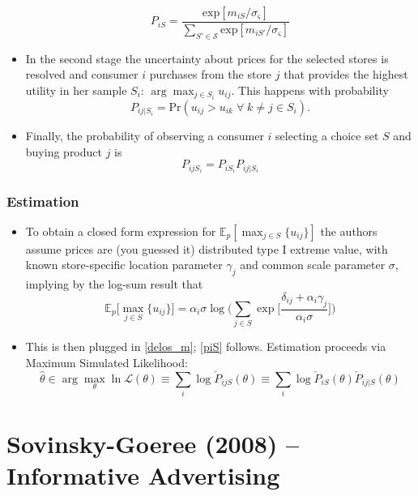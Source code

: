\documentclass[11pt]{article}
\numberwithin{equation}{section}
\begin{document}
\begin{itemize}
		\begin{equation}
    \label{piS}
		P_{iS} = \frac{\text{exp}[m_{iS}/\sigma_{\varsigma}]}{\sum_{S'\in \mathscr{S}}\text{exp}[m_{iS'}/\sigma_{\varsigma}]}
		\end{equation}
		\item In the second stage the uncertainty about prices for the selected stores is resolved and consumer $i$ purchases from the store $j$ that provides the highest utility in her sample $S_i$: $\arg\max_{j\in S_i}u_{ij}$. This happens with probability
		\begin{equation}
		P_{ij|S_i}=\text{Pr}(u_{ij}>u_{ik}\;\forall\;k\neq j\in S_i).
		\end{equation}
		\item Finally, the probability of observing a consumer $i$ selecting a choice set $S$ and buying product $j$ is
		\begin{equation}
		P_{ijS_i} = P_{iS_i}P_{ij|S_i}
		\end{equation}
		\end{itemize}
	\subsubsection*{Estimation}
	 \begin{itemize}
		\item To obtain a closed form expression for $\mathbb{E}_p[\max_{j\in S}\{u_{ij}\}]$ the authors assume prices are (you guessed it) distributed type I extreme value, with known store-specific location parameter $\gamma_j$ and common scale parameter $\sigma$, implying by the log-sum result that
		\begin{equation}
		\mathbb{E}_p\bigg[\max_{j\in S}\{u_{ij}\}\bigg]=\alpha_i\sigma\log\bigg(\sum_{j\in S}\exp\bigg[\frac{\delta_{ij}+\alpha_i\gamma_j}{\alpha_i\sigma}\bigg]\bigg)
		\end{equation}
		\item This is then plugged in \eqref{delos_m}; \eqref{piS} follows. Estimation proceeds via Maximum Simulated Likelihood:
		\begin{equation}
		\hat\theta \in \arg\max_\theta \ln \mathscr{L}(\theta) \equiv \sum_{i}\log\check{P}_{ijS} (\theta) \equiv \sum_{i}\log\check{P}_{iS} (\theta) \check{P}_{ij|S} (\theta)
		\end{equation}
	\end{itemize}


	\section{Sovinsky-Goeree (2008) -- Informative Advertising}
\end{document}
